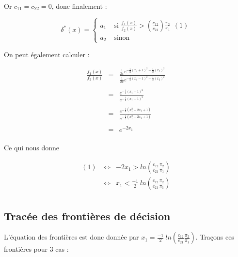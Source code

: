 \documentclass[a4paper,11pt]{article}
\begin{document}
 \noindent Or $c_{11} = c_{22} = 0$, donc finalement :
 
 $$\delta^* (x) = \left\{\begin{array}{ll}
 a_1 & \mbox{ si $\frac{f_1(x)}{f_2(x)} > \left( \frac{c_{12}}{c_{21}}\right) \frac{\pi_2}{\pi_1}$} \ \ (1)\\
 a_2 & \mbox{ sinon }
 \end{array}\right.$$
 
\noindent On peut également calculer :
 
 \begin{center}
   $$ 
   \begin{array}{rcl}
 \frac{f_1(x)}{f_2(x)} &=&  \displaystyle \frac{\frac{1}{2 \pi}    e^{-\frac{1}{2} (x_1 +1)^2 - \frac{1}{2} (x_2)^2}}{\frac{1}{2 \pi}    e^{-\frac{1}{2} (x_1 -1)^2 - \frac{1}{2} (x_2)^2}} \\ \\
 			       &=& \displaystyle \frac{e^{-\frac{1}{2} (x_1 +1)^2}}{e^{-\frac{1}{2} (x_1 -1)^2}} \\ \\
			       &=& \displaystyle \frac{e^{-\frac{1}{2}(x_1^2 + 2x_1 + 1)}}{e^{-\frac{1}{2}(x_1^2 -2x_1 +1)}} \\ \\
			       &=& e^{-2x_1}\\
	      \end{array}
   $$
\end{center}

\noindent Ce qui nous donne 

\begin{center}
   $$ 
   \begin{array}{rcl}
 (1) \ &\Leftrightarrow &  -2x_1 > ln\left( \frac{c_{12}}{c_{21}} \frac{\pi_2}{\pi_1}\right) \\
         &\Leftrightarrow & x_1 < \frac{-1}{2} \ ln\left( \frac{c_{12}}{c_{21}} \frac{\pi_2}{\pi_1}\right) \\
	      \end{array}
   $$
\end{center}

\subsection{Tracée des frontières de décision}

\noindent L'équation des frontières est donc donnée par $x_1 = \frac{-1}{2} \ ln\left( \frac{c_{12}}{c_{21}} \frac{\pi_2}{\pi_1}\right)$. Traçons ces frontières pour 3 cas :  \\
\end{document}
